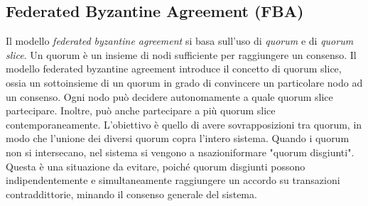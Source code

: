 \subsection{Federated Byzantine Agreement (FBA)}
\label{intro:fba}
Il modello \textit{federated byzantine agreement} si basa sull'uso di \textit{quorum}
e di \textit{quorum slice}.
Un quorum è un insieme di nodi sufficiente per raggiungere un consenso.
Il modello federated byzantine agreement introduce il concetto di quorum slice, ossia
un sottoinsieme di un quorum in grado di convincere un particolare nodo ad un consenso.
Ogni nodo può decidere autonomamente a quale quorum slice partecipare. Inoltre, può anche partecipare a
più quorum slice contemporaneamente.
L'obiettivo è quello di avere sovrapposizioni tra quorum, in modo che l'unione dei diversi quorum
copra l'intero sistema. Quando i quorum non si intersecano, nel sistema si vengono a nsazioniformare
"quorum disgiunti". Questa è una situazione da evitare, poiché quorum disgiunti
possono indipendentemente e simultaneamente raggiungere un accordo su transazioni contraddittorie,
minando il consenso generale del sistema.



